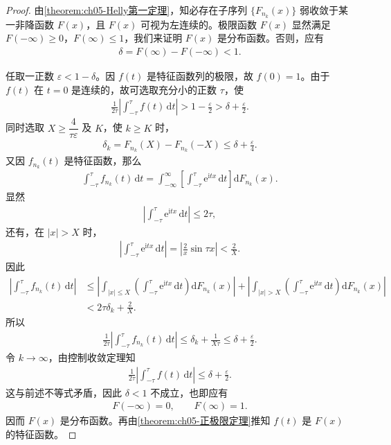 \documentclass[../../main.tex]{subfiles}
\begin{document}
\begin{proof}
由\cref{theorem:ch05-Helly第一定理}，知必存在子序列 $\{F_{n_k}(x)\}$ 弱收敛于某一非降函数 $F(x)$，且 $F(x)$ 可视为左连续的。极限函数 $F(x)$ 显然满足 $F(-\infty)\geqslant0$，$F(\infty)\leqslant1$，我们来证明 $F(x)$ 是分布函数。否则，应有
\begin{align}
\delta=F(\infty)-F(-\infty)<1.
\end{align}

任取一正数 $\varepsilon<1-\delta$。因 $f(t)$ 是特征函数列的极限，故 $f(0)=1$。由于 $f(t)$ 在 $t=0$ 是连续的，故可选取充分小的正数 $\tau$，使
\begin{align}
\frac{1}{2\tau}\left|\int_{-\tau}^{\tau}f(t)\,\mathrm{d}t\right|>1-\frac{\varepsilon}{2}>\delta+\frac{\varepsilon}{2}.
\end{align}
同时选取 $X\geqslant\dfrac{4}{\tau\varepsilon}$ 及 $K$，使 $k\geqslant K$ 时，
\begin{align*}
\delta_k=F_{n_k}(X)-F_{n_k}(-X)\leqslant\delta+\frac{\varepsilon}{4}.
\end{align*}
又因 $f_{n_k}(t)$ 是特征函数，那么
\begin{align}
\int_{-\tau}^{\tau}f_{n_k}(t)\,\mathrm{d}t=\int_{-\infty}^{\infty}\left[\int_{-\tau}^{\tau}\mathrm{e}^{\mathrm{i}tx}\,\mathrm{d}t\right]\mathrm{d}F_{n_k}(x).
\end{align}
显然
\begin{align*}
\left|\int_{-\tau}^{\tau}\mathrm{e}^{\mathrm{i}tx}\,\mathrm{d}t\right|\leqslant 2\tau,
\end{align*}
还有，在 $|x|>X$ 时，
\begin{align}
\left|\int_{-\tau}^{\tau}\mathrm{e}^{\mathrm{i}tx}\,\mathrm{d}t\right|=\left|\frac{2}{x}\sin\tau x\right|<\frac{2}{X}.
\end{align}
因此
\begin{align*}
\left|\int_{-\tau}^{\tau}f_{n_k}(t)\,\mathrm{d}t\right|
&\leqslant\left|\int_{|x|\leqslant X}\left(\int_{-\tau}^{\tau}\mathrm{e}^{\mathrm{i}tx}\,\mathrm{d}t\right)\mathrm{d}F_{n_k}(x)\right|
+\left|\int_{|x|>X}\left(\int_{-\tau}^{\tau}\mathrm{e}^{\mathrm{i}tx}\,\mathrm{d}t\right)\mathrm{d}F_{n_k}(x)\right|\\
&<2\tau\delta_k+\frac{2}{X}.
\end{align*}
所以
\begin{align*}
\frac{1}{2\tau}\left|\int_{-\tau}^{\tau}f_{n_k}(t)\,\mathrm{d}t\right|\leqslant\delta_k+\frac{1}{X\tau}\leqslant\delta+\frac{\varepsilon}{2}.
\end{align*}
令 $k\to\infty$，由控制收敛定理知
\begin{align*}
\frac{1}{2\tau}\left|\int_{-\tau}^{\tau}f(t)\,\mathrm{d}t\right|\leqslant\delta+\frac{\varepsilon}{2}.
\end{align*}
这与前述不等式矛盾，因此 $\delta<1$ 不成立，也即应有
\begin{align*}
F(-\infty)=0,\qquad F(\infty)=1.
\end{align*}
因而 $F(x)$ 是分布函数。再由\cref{theorem:ch05-正极限定理}推知 $f(t)$ 是 $F(x)$ 的特征函数。


\end{proof}
\end{document}
